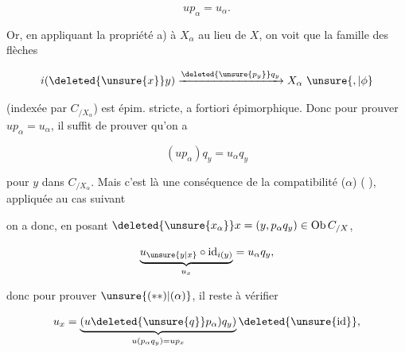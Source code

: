 \[ up_{\alpha}=u_{\alpha}. \]

Or, en appliquant la propriété a) à $X_\alpha$ au lieu de $X$, on voit que la famille des flèches

\[ i(\deleted{\unsure{x}}y)\xrightarrow{\deleted{\unsure{p_y}}q_y}X_\alpha\ \unsure{,|\phi} \]

(indexée par $C_{/X_\alpha}$) est épim. stricte, a fortiori épimorphique. Donc pour prouver $up_\alpha=u_\alpha$, il suffit de prouver qu'on a

{\makeatletter\tagsleft@true\makeatother
\[ (up_\alpha)q_y=u_\alpha q_y \tag*{$(**)$} \]
}

pour  $y$ dans $C_{/X_\alpha}$. Mais c'est là une conséquence de la compatibilité ($\alpha$) ( ), appliquée au cas suivant\unsure{:}


on a donc, en posant $\deleted{\unsure{x_\alpha}}x=(y,p_\alpha q_y)\in\mathrm{Ob}\,C_{/X}$,

\[ \underbrace{u_{\unsure{y|x}}\circ\mathrm{id}_{i(y)}}_{u_x}=u_\alpha q_y, \]

donc pour prouver $\unsure{(**)|(\alpha)}$, il reste à vérifier

\[ u_x=\underbrace{(u\deleted{\unsure{q}}p_\alpha)q_y)}_{u(p_\alpha q_y)=up_x}\deleted{\unsure{\mathrm{id}}}, \]
